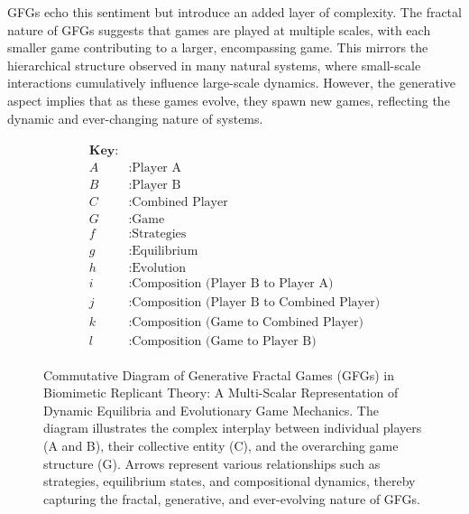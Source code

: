 \documentclass[sn-nature]{sn-jnl}%
\theoremstyle{thmstyleone}%
\theoremstyle{thmstyletwo}%
\theoremstyle{thmstylethree}%
\begin{document}
GFGs echo this sentiment but introduce an added layer of complexity. The fractal nature of GFGs suggests that games are played at multiple scales, with each smaller game contributing to a larger, encompassing game. This mirrors the hierarchical structure observed in many natural systems, where small-scale interactions cumulatively influence large-scale dynamics. However, the generative aspect implies that as these games evolve, they spawn new games, reflecting the dynamic and ever-changing nature of systems\cite{noble_biological_2019}.

\begin{figure}[h]
\centering
\begin{minipage}{0.55\textwidth}  %
\centering
{}
\end{minipage}%
\begin{minipage}{0.35\textwidth}  %
\begin{align*}
\boxed{
\begin{aligned}
\textbf{Key:} \\
A & : \text{Player A} \\
B & : \text{Player B} \\
C & : \text{Combined Player} \\
G & : \text{Game} \\
f & : \text{Strategies} \\
g & : \text{Equilibrium} \\
h & : \text{Evolution} \\
i & : \text{Composition (Player B to Player A)} \\
j & : \text{Composition (Player B to Combined Player)} \\
k & : \text{Composition (Game to Combined Player)} \\
l & : \text{Composition (Game to Player B)}
\end{aligned}
}
\end{align*}
\end{minipage}
\caption[Commutative Diagram of Generative Fractal Games]{Commutative Diagram of Generative Fractal Games (GFGs) in Biomimetic Replicant Theory: A Multi-Scalar Representation of Dynamic Equilibria and Evolutionary Game Mechanics. The diagram illustrates the complex interplay between individual players (A and B), their collective entity (C), and the overarching game structure (G). Arrows represent various relationships such as strategies, equilibrium states, and compositional dynamics, thereby capturing the fractal, generative, and ever-evolving nature of GFGs.}
\label{marker}
\end{figure}
\end{document}
